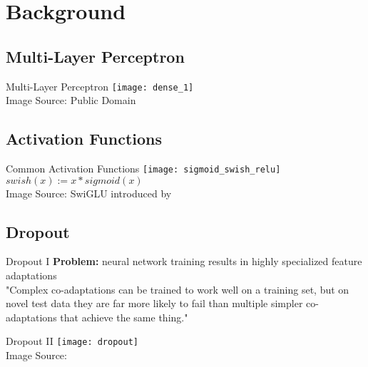 \section{Background}
\subsection{Multi-Layer Perceptron}
\begin{frame}[c]{Multi-Layer Perceptron}
    \texttt{[image: dense\_1]} \\
    \normalsize
    Image Source: Public Domain
\end{frame}

\subsection{Activation Functions}
\begin{frame}[c]{Common Activation Functions}
    \texttt{[image: sigmoid\_swish\_relu]} \\
    $swish(x) := x * sigmoid(x)$ \\
    Image Source: \cite{chen_deep_2021} \hspace{1cm}
    SwiGLU introduced by \cite{shazeer_glu_2020}
\end{frame}

\subsection{Dropout}
\begin{frame}[c]{Dropout I}
    \large
    \textbf{Problem: } neural network training results in highly specialized feature adaptations \\
    "Complex co-adaptations can be trained to work well on a training set, but on novel test data they are far more likely to fail than multiple simpler co-adaptations that achieve the same thing." \cite{srivastava_dropout_2014}
\end{frame}

\begin{frame}[c]{Dropout II}
    \texttt{[image: dropout]} \\
    Image Source: \cite{srivastava_dropout_2014}
\end{frame}


